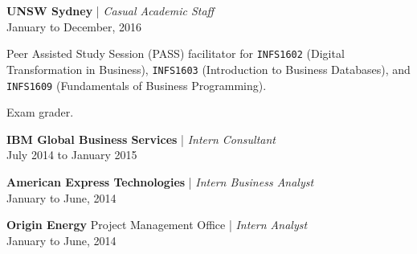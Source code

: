 \vspace{20pt}

\noindent \textbf{UNSW Sydney} | \textit{Casual Academic Staff}
\\ January to December, 2016
\begin{myitemize}
	\item Peer Assisted Study Session (PASS) facilitator for \texttt{INFS1602} (Digital Transformation in Business), \texttt{INFS1603} (Introduction to Business Databases), and \texttt{INFS1609} (Fundamentals of Business Programming).
	\item Exam grader.
\end{myitemize}

\vspace{20pt}

\noindent \textbf{IBM Global Business Services} | \textit{Intern Consultant}
\\ July 2014 to January 2015

\vspace{20pt}

\noindent \textbf{American Express Technologies} | \textit{Intern Business Analyst}
\\ January to June, 2014

\vspace{20pt}

\noindent \textbf{Origin Energy} Project Management Office | \textit{Intern Analyst}
\\ January to June, 2014

\vspace{20pt}